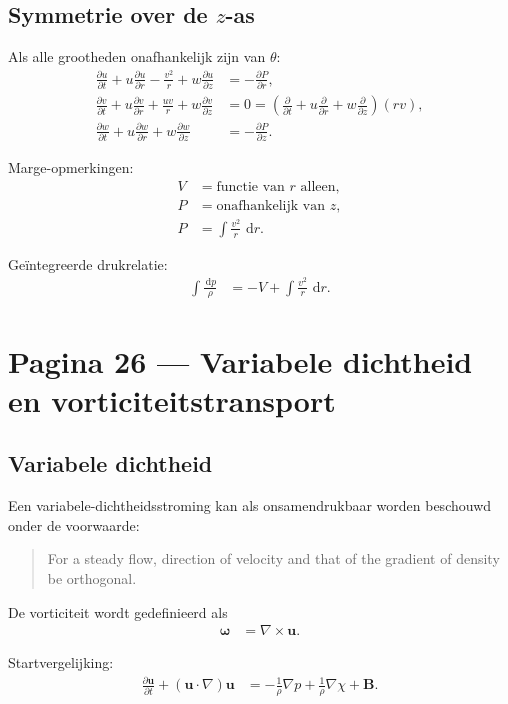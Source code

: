 \documentclass[11pt]{article}
\newcommand{\dd}{\,\mathrm{d}}
\newcommand{\pd}[2]{\frac{\partial #1}{\partial #2}}
\newcommand{\vect}[1]{\mathbf{#1}}
\begin{document}
\subsection*{Symmetrie over de $z$-as}

Als alle grootheden onafhankelijk zijn van $\theta$:
\begin{align*}
\pd{u}{t}
+u\pd{u}{r}
-\frac{v^2}{r}
+w\pd{u}{z}
&=
-\pd{P}{r},
\\
\pd{v}{t}
+u\pd{v}{r}
+\frac{uv}{r}
+w\pd{v}{z}
&=
0
=
\left(
\pd{}{t}
+u\pd{}{r}
+w\pd{}{z}
\right)(rv),
\\
\pd{w}{t}
+u\pd{w}{r}
+w\pd{w}{z}
&=
-\pd{P}{z}.
\end{align*}

Marge-opmerkingen:
\begin{align*}
V &= \text{functie van } r \text{ alleen},\\
P &= \text{onafhankelijk van } z,\\
P &= \int \frac{v^2}{r}\,\dd r.
\end{align*}

Geïntegreerde drukrelatie:
\begin{align*}
\int \frac{\dd p}{\rho}
  &=
  -V+\int \frac{v^2}{r}\,\dd r .
\end{align*}

\newpage

\section*{Pagina 26 --- Variabele dichtheid en vorticiteitstransport}

\subsection*{Variabele dichtheid}

Een variabele-dichtheidsstroming kan als onsamendrukbaar worden beschouwd onder de voorwaarde:
\begin{quote}
For a steady flow, direction of velocity and that of the gradient of density be orthogonal.
\end{quote}

De vorticiteit wordt gedefinieerd als
\begin{align*}
\bm{\omega}
  &=
  \nabla\times\vect{u}.
\end{align*}

Startvergelijking:
\begin{align*}
\pd{\vect{u}}{t}
+\left(\vect{u}\cdot\nabla\right)\vect{u}
&=
-\frac{1}{\rho}\nabla p
+\frac{1}{\rho}\nabla\chi
+\vect{B}.
\end{align*}
\end{document}
